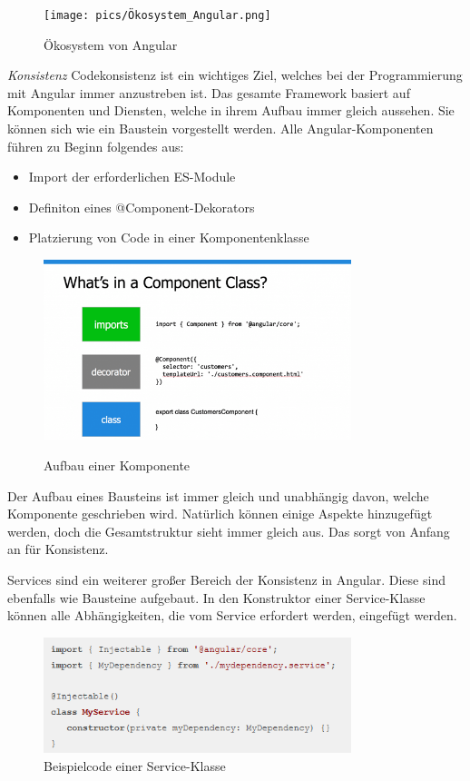 \begin{figure}[H]
  \centering
  \texttt{[image: pics/Ökosystem\_Angular.png]}
  \caption{Ökosystem von Angular}
  \cite{OekosystemAngularBild}
\end{figure}

\textit{Konsistenz}
Codekonsistenz ist ein wichtiges Ziel, welches bei der Programmierung mit Angular immer anzustreben ist. Das gesamte Framework basiert auf Komponenten und Diensten, welche in ihrem Aufbau immer gleich aussehen. Sie können sich wie ein Baustein vorgestellt werden. Alle Angular-Komponenten führen zu Beginn folgendes aus:

\begin{itemize}
  \item Import der erforderlichen ES-Module
  \item Definiton eines @Component-Dekorators
  \item Platzierung von Code in einer Komponentenklasse
\end{itemize}	

\begin{figure}[H]
  \centering
  \includegraphics[width=0.8\textwidth]{pics/Komponenten_Klasse.png}
  \caption{Aufbau einer Komponente}
  \cite{AufbauKomponenteBild}
\end{figure}

Der Aufbau eines Bausteins ist immer gleich und unabhängig davon, welche Komponente geschrieben wird. Natürlich können einige Aspekte hinzugefügt werden, doch die Gesamtstruktur sieht immer gleich aus. Das sorgt von Anfang an für Konsistenz.

Services sind ein weiterer großer Bereich der Konsistenz in Angular. Diese sind ebenfalls wie Bausteine aufgebaut. In den Konstruktor einer Service-Klasse können alle Abhängigkeiten, die vom Service erfordert werden, eingefügt werden.

\begin{figure}[H]
  \centering
  \includegraphics[width=0.8\textwidth]{pics/Code_Service.png}
  \caption{Beispielcode einer Service-Klasse}
\end{figure}

